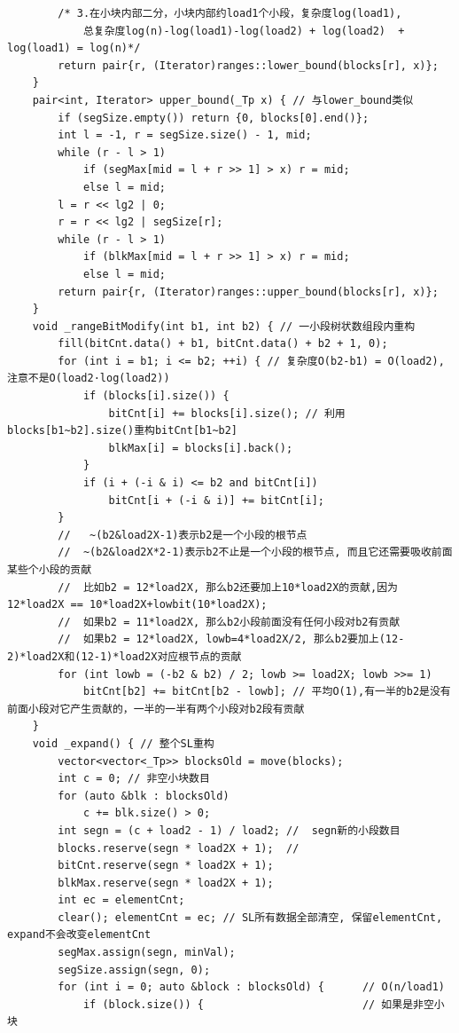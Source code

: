 \documentclass[UTF8,twoside]{ctexart}
\begin{document}
\begin{lstlisting}
        /* 3.在小块内部二分，小块内部约load1个小段，复杂度log(load1),
            总复杂度log(n)-log(load1)-log(load2) + log(load2)  + log(load1) = log(n)*/
        return pair{r, (Iterator)ranges::lower_bound(blocks[r], x)};
    }
    pair<int, Iterator> upper_bound(_Tp x) { // 与lower_bound类似
        if (segSize.empty()) return {0, blocks[0].end()};
        int l = -1, r = segSize.size() - 1, mid;
        while (r - l > 1)
            if (segMax[mid = l + r >> 1] > x) r = mid;
            else l = mid;
        l = r << lg2 | 0;
        r = r << lg2 | segSize[r];
        while (r - l > 1)
            if (blkMax[mid = l + r >> 1] > x) r = mid;
            else l = mid;
        return pair{r, (Iterator)ranges::upper_bound(blocks[r], x)};
    }
    void _rangeBitModify(int b1, int b2) { // 一小段树状数组段内重构
        fill(bitCnt.data() + b1, bitCnt.data() + b2 + 1, 0);
        for (int i = b1; i <= b2; ++i) { // 复杂度O(b2-b1) = O(load2),注意不是O(load2·log(load2))
            if (blocks[i].size()) {
                bitCnt[i] += blocks[i].size(); // 利用blocks[b1~b2].size()重构bitCnt[b1~b2]
                blkMax[i] = blocks[i].back();
            }
            if (i + (-i & i) <= b2 and bitCnt[i])
                bitCnt[i + (-i & i)] += bitCnt[i];
        }
        //   ~(b2&load2X-1)表示b2是一个小段的根节点
        //  ~(b2&load2X*2-1)表示b2不止是一个小段的根节点, 而且它还需要吸收前面某些个小段的贡献
        //  比如b2 = 12*load2X, 那么b2还要加上10*load2X的贡献,因为12*load2X == 10*load2X+lowbit(10*load2X);
        //  如果b2 = 11*load2X, 那么b2小段前面没有任何小段对b2有贡献
        //  如果b2 = 12*load2X, lowb=4*load2X/2, 那么b2要加上(12-2)*load2X和(12-1)*load2X对应根节点的贡献
        for (int lowb = (-b2 & b2) / 2; lowb >= load2X; lowb >>= 1)
            bitCnt[b2] += bitCnt[b2 - lowb]; // 平均O(1),有一半的b2是没有前面小段对它产生贡献的，一半的一半有两个小段对b2段有贡献
    }
    void _expand() { // 整个SL重构
        vector<vector<_Tp>> blocksOld = move(blocks);
        int c = 0; // 非空小块数目
        for (auto &blk : blocksOld)
            c += blk.size() > 0;
        int segn = (c + load2 - 1) / load2; //  segn新的小段数目
        blocks.reserve(segn * load2X + 1);  //
        bitCnt.reserve(segn * load2X + 1);
        blkMax.reserve(segn * load2X + 1);
        int ec = elementCnt;
        clear(); elementCnt = ec; // SL所有数据全部清空, 保留elementCnt, expand不会改变elementCnt
        segMax.assign(segn, minVal);
        segSize.assign(segn, 0);
        for (int i = 0; auto &block : blocksOld) {      // O(n/load1)
            if (block.size()) {                         // 如果是非空小块

\end{lstlisting}
\end{document}
